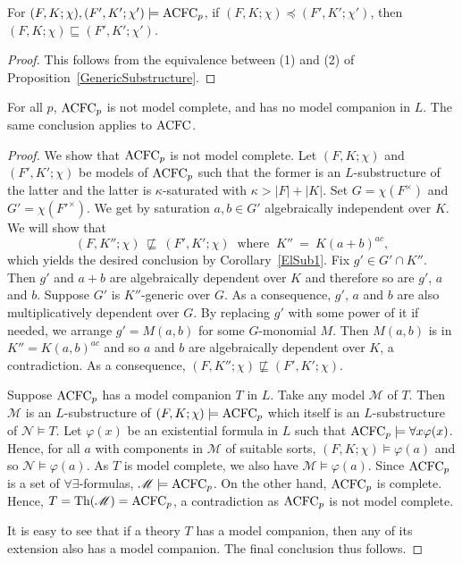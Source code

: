 \begin{cor} \label{ElSub1}
For $(F, K; \chi), (F', K';\chi') \models \mathrm{ACFC}_p$, if  $(F,K;\chi) \preccurlyeq (F',K';\chi')$, then $(F,K;\chi)\sqsubseteq (F',K';\chi')$.
\end{cor}

\begin{proof}
This follows from the equivalence between (1) and (2) of Proposition~\ref{GenericSubstructure}.
\end{proof}


\begin{cor}
For all $p$, $\mathrm{ACFC}_p$ is not model complete, and has no model companion in $L$. The same conclusion applies to $\mathrm{ACFC}$.
\end{cor}

\begin{proof}
We show that $\mathrm{ACFC}_p$ is not model complete. Let $(F, K; \chi)$ and $(F', K'; \chi)$  be models of $\mathrm{ACFC}_p$ such that the former is an $L$-substructure of the latter and the latter is $\kappa$-saturated with $\kappa > |F| + |K|$. Set $G = \chi(F^\times)$ and $G'= \chi({F'}^\times) $. We get by saturation $a, b \in G'$ algebraically independent over $K$.
We will show that 
$$(F, K''; \chi)\ \not \sqsubseteq\ (F', K'; \chi)\ \text{ where }\ K''\ =\ K (a + b) ^{ac},$$ which yields the desired conclusion by Corollary~\ref{ElSub1}.
Fix $g'\in G' \cap K''$. Then $g'$ and $a + b$ are algebraically dependent over $K$ and therefore so are $g'$, $a$ and $b$. 
Suppose $G'$ is $K''$-generic over $G $. As a consequence, $g'$, $a$ and $b$ are also multiplicatively dependent over $G$.  By replacing $g'$ with some power of it if needed, we arrange $g' = M(a, b)$ for some $G$-monomial $M$. Then $M(a, b)$ is in $K'' = K(a, b)^{ac}$ and so $a$ and $b$  are algebraically dependent over $K$, a contradiction. As a consequence, $(F, K''; \chi) \not \sqsubseteq (F', K'; \chi)$.

\noindent Suppose $\mathrm{ACFC}_p$ has a model companion $T$ in $L$.
Take any model $\mathscr{M}$ of $T$. 
Then $\mathscr{M}$ is an $L$-substructure of $(F,K;\chi) \models \mathrm{ACFC}_p$ which itself is an $L$-substructure of $\mathscr{N} \models T$.
Let $\varphi(x)$ be an existential formula in $L$ such that $\mathrm{ACFC}_p \models \forall x \varphi(x)$. Hence, for all $a$ with components in $\mathscr{M}$ of suitable sorts, $(F,K;\chi) \models \varphi(a)$ and so $\mathscr{N} \models \varphi(a)$. As $T$ is model complete, we also have  $\mathscr{M} \models \varphi(a)$. 
Since $\mathrm{ACFC}_p$ is  a set of $\forall \exists$-formulas, $\mathscr{M} \models \mathrm{ACFC}_p$.
On the other hand, $\mathrm{ACFC}_p$ is complete. Hence, $T = \text{Th}(  \mathscr{M}) = \mathrm{ACFC}_p$, a contradiction as $\mathrm{ACFC}_p$ is not model complete.

It is easy to see that if a theory $T$ has a model companion, then any of its extension also has a model  companion. The final conclusion thus follows.
\end{proof}

